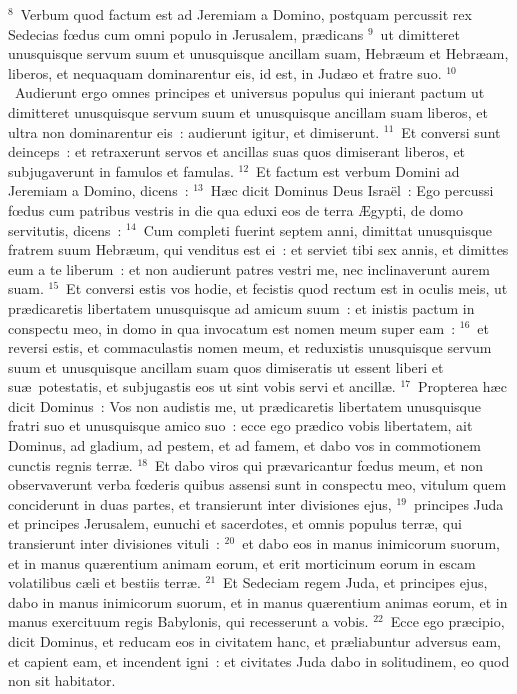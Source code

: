 ${}^{8}$~Verbum quod factum est ad Jeremiam a Domino, postquam percussit rex Sedecias fœdus cum omni populo in Jerusalem, pr\ae dicans
${}^{9}$~ut dimitteret unusquisque servum suum et unusquisque ancillam suam, Hebr\ae um et Hebr\ae am, liberos, et nequaquam dominarentur eis, id est, in Jud\ae o et fratre suo.
${}^{10}$~Audierunt ergo omnes principes et universus populus qui inierant pactum ut dimitteret unusquisque servum suum et unusquisque ancillam suam liberos, et ultra non dominarentur eis~: audierunt igitur, et dimiserunt.
${}^{11}$~Et conversi sunt deinceps~: et retraxerunt servos et ancillas suas quos dimiserant liberos, et subjugaverunt in famulos et famulas.
${}^{12}$~Et factum est verbum Domini ad Jeremiam a Domino, dicens~:
${}^{13}$~H\ae c dicit Dominus Deus Isra\"el~: Ego percussi fœdus cum patribus vestris in die qua eduxi eos de terra \AE gypti, de domo servitutis, dicens~:
${}^{14}$~Cum completi fuerint septem anni, dimittat unusquisque fratrem suum Hebr\ae um, qui venditus est ei~: et serviet tibi sex annis, et dimittes eum a te liberum~: et non audierunt patres vestri me, nec inclinaverunt aurem suam.
${}^{15}$~Et conversi estis vos hodie, et fecistis quod rectum est in oculis meis, ut pr\ae dicaretis libertatem unusquisque ad amicum suum~: et inistis pactum in conspectu meo, in domo in qua invocatum est nomen meum super eam~:
${}^{16}$~et reversi estis, et commaculastis nomen meum, et reduxistis unusquisque servum suum et unusquisque ancillam suam quos dimiseratis ut essent liberi et su\ae\ potestatis, et subjugastis eos ut sint vobis servi et ancill\ae .
${}^{17}$~Propterea h\ae c dicit Dominus~: Vos non audistis me, ut pr\ae dicaretis libertatem unusquisque fratri suo et unusquisque amico suo~: ecce ego pr\ae dico vobis libertatem, ait Dominus, ad gladium, ad pestem, et ad famem, et dabo vos in commotionem cunctis regnis terr\ae .
${}^{18}$~Et dabo viros qui pr\ae varicantur fœdus meum, et non observaverunt verba fœderis quibus assensi sunt in conspectu meo, vitulum quem conciderunt in duas partes, et transierunt inter divisiones ejus,
${}^{19}$~principes Juda et principes Jerusalem, eunuchi et sacerdotes, et omnis populus terr\ae , qui transierunt inter divisiones vituli~:
${}^{20}$~et dabo eos in manus inimicorum suorum, et in manus qu\ae rentium animam eorum, et erit morticinum eorum in escam volatilibus c\ae li et bestiis terr\ae .
${}^{21}$~Et Sedeciam regem Juda, et principes ejus, dabo in manus inimicorum suorum, et in manus qu\ae rentium animas eorum, et in manus exercituum regis Babylonis, qui recesserunt a vobis.
${}^{22}$~Ecce ego pr\ae cipio, dicit Dominus, et reducam eos in civitatem hanc, et pr\ae liabuntur adversus eam, et capient eam, et incendent igni~: et civitates Juda dabo in solitudinem, eo quod non sit habitator.

